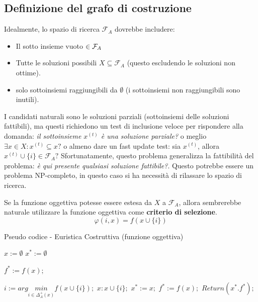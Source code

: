 \documentclass{article}
\begin{document}
    \subsection{Definizione del grafo di costruzione}
    Idealmente, lo spazio di ricerca $\mathcal{F}_A$ dovrebbe includere:
    \begin{itemize}
        \item Il sotto insieme vuoto $\empty \in \mathcal{F}_A$
        \item Tutte le soluzioni possibili $X\subseteq\mathcal{F}_A$ (questo escludendo
              le soluzioni non ottime).
        \item solo sottoinsiemi raggiungibili da $\emptyset$ (i sottoinsiemi non raggiungibili sono inutili).
    \end{itemize}
    I candidati naturali sono le soluzioni parziali (sottoinsiemi delle soluzioni fattibili), ma questi
    richiedono un test di inclusione veloce per rispondere alla domanda:
    \textit{il sottoinsieme $x^{(t)}$ è una soluzione parziale?} o meglio $\exists x \in X : x^{(t)}\subseteq x?$
    o almeno dare un fast update test: sia $x^{(t)}$, allora $x^{(t)} \cup \{i\}\in\mathcal{F}_A?$
    Sfortunatamente, questo problema generalizza la fattibilità del problema: \textit{è qui presente qualsiasi soluzione fattibile?}.
    Questo potrebbe essere un problema NP-completo, in questo caso si ha necessità di rilassare lo spazio di ricerca.

    Se la funzione oggettiva potesse essere estesa da $X$ a $\mathcal{F}_A$, allora sembrerebbe naturale
    utilizzare la funzione oggettiva come \textbf{criterio di selezione}.
    $$\varphi(i,x)=f(x\cup\{i\})$$
    \begin{algorithm}[H]
        \caption{Pseudo codice - Euristica Costruttiva (funzione oggettiva)}
        \label{alg:cons_heu_fx}
        \begin{algorithmic}
            \State $x:=\emptyset$
            \State $x^*:=\emptyset$

            \State $f^*:=f(x);$
            \Else
            \EndIf

            \State $i:=arg\underset{i\in\Delta_A^+(x)}{min}f(x\cup\{i\});$
            \State $x:x\cup\{i\};$
            \State $x^* := x;$
            \State $f^* := f(x);$
            \EndIf
            \EndWhile
            \State $Return(x^*.f^*);$
        \end{algorithmic}
    \end{algorithm}
\end{document}
